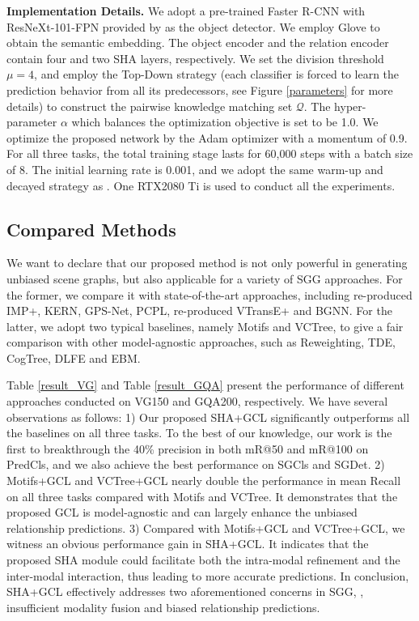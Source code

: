 \documentclass[10pt,twocolumn,letterpaper]{article}
\begin{document}
\noindent\textbf{Implementation Details.} We adopt a pre-trained Faster R-CNN \cite{Ren2017Faster} with ResNeXt-101-FPN\cite{xie2017aggregated} provided by \cite{tang2020unbiased} as the object detector. We employ Glove\cite{pennington2014glove} to obtain the semantic embedding. The object encoder and the relation encoder contain four and two SHA layers, respectively. We set the division threshold $\mu=4$, and employ the Top-Down strategy (each classifier is forced to learn the prediction behavior from all its predecessors, see Figure \ref{parameters} for more details) to construct the pairwise knowledge matching set $\mathcal{Q}$. The hyper-parameter $\alpha$ which balances the optimization objective is set to be 1.0. We optimize the proposed network by the Adam optimizer with a momentum of 0.9. For all three tasks, the total training stage lasts for 60,000 steps with a batch size of 8. The initial learning rate is 0.001, and we adopt the same warm-up and decayed strategy as \cite{tang2020unbiased}. One RTX2080 Ti is used to conduct all the experiments.

\subsection{Compared Methods}
We want to declare that our proposed method is not only powerful in generating unbiased scene graphs, but also applicable for a variety of SGG approaches. For the former, we compare it with state-of-the-art approaches, including re-produced IMP+\cite{xu2017scene}, KERN\cite{chen2019knowledge}, GPS-Net\cite{lin2020gps}, PCPL\cite{yan2020pcpl}, re-produced VTransE+\cite{zhang2017visual} and BGNN\cite{li2021bipartite}. For the latter, we adopt two typical baselines, namely Motifs\cite{zellers2018neural} and VCTree\cite{tang2019learning}, to give a fair comparison with other model-agnostic approaches, such as Reweighting\cite{chiou2021recovering},  TDE\cite{tang2020unbiased}, CogTree\cite{yu2020cogtree}, DLFE\cite{chiou2021recovering} and EBM\cite{suhail2021energy}. 

Table \ref{result_VG} and Table \ref{result_GQA} present the performance of different approaches conducted on VG150 and GQA200, respectively. We have several observations as follows: 1) Our proposed SHA+GCL significantly outperforms all the baselines on all three tasks. To the best of our knowledge, our work is the first to breakthrough the 40\% precision in both mR@50 and mR@100 on PredCls, and we also achieve the best performance on SGCls and SGDet. 2) Motifs+GCL and VCTree+GCL nearly double the performance in mean Recall on all three tasks compared with Motifs and VCTree. It demonstrates that the proposed GCL is model-agnostic and can largely enhance the unbiased relationship predictions. 3) Compared with Motifs+GCL and VCTree+GCL, we witness an obvious performance gain in SHA+GCL. It indicates that the proposed SHA module could facilitate both the intra-modal refinement and the inter-modal interaction, thus leading to more accurate predictions. In conclusion, SHA+GCL effectively addresses two aforementioned concerns in SGG, \ie, insufficient modality fusion and biased relationship predictions.
\end{document}
